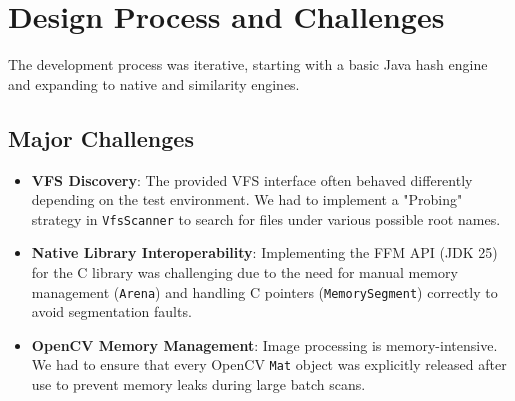 \section{Design Process and Challenges}
The development process was iterative, starting with a basic Java hash engine and expanding to native and similarity engines.

\subsection*{Major Challenges}
\begin{itemize}
    \item \textbf{VFS Discovery}: The provided VFS interface often behaved differently depending on the test environment. We had to implement a "Probing" strategy in \texttt{VfsScanner} to search for files under various possible root names.
    \item \textbf{Native Library Interoperability}: Implementing the FFM API (JDK 25) for the C library was challenging due to the need for manual memory management (\texttt{Arena}) and handling C pointers (\texttt{MemorySegment}) correctly to avoid segmentation faults.
    \item \textbf{OpenCV Memory Management}: Image processing is memory-intensive. We had to ensure that every OpenCV \texttt{Mat} object was explicitly released after use to prevent memory leaks during large batch scans.
\end{itemize}
